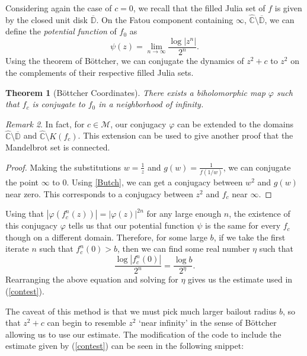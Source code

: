 \documentclass{amsart}
\newcommand{\bbC}{\mathbb{C}}
\newcommand{\cal}[1]{ \mathcal{#1}}
\newcommand{\bbCS}{\hat{\bbC}}
\newcommand{\Mand}{\cal{M}}
\newcommand{\abs}[1]{ \left| #1 \right| }
\renewcommand{\phi}{\varphi}
\newtheorem{thm}{Theorem}[section]
\theoremstyle{definition}
\theoremstyle{remark}
\newtheorem{rem}[thm]{Remark}
\numberwithin{equation}{section}
\begin{document}
Considering again the case of $c=0$, we recall that the filled Julia set of $f$ is given by the closed unit disk $\overline{\mathbb{D}}$. On the Fatou component containing $\infty$, $\bbCS\setminus \overline{\mathbb{D}}$, we can define the \emph{potential function} of $f_0$ as
\begin{equation}
  \psi(z)=\lim\limits_{n\to\infty}\frac{\log \abs{z^n}}{2^n}.
\end{equation}
Using the theorem of B\"ottcher, we can conjugate the dynamics of $z^2+c$ to $z^2$ on the complements of their respective filled Julia sets.
\begin{thm}[B\"ottcher Coordinates]
  There exists a biholomorphic map $\phi$ such that $f_c$ is conjugate to $f_0$ in a neighborhood of infinity.
\end{thm}
\begin{rem}
  In fact, for $c\in \Mand$, our conjugacy $\phi$ can be extended to the domains $\bbCS\setminus \overline{\mathbb{D}}$ and $\bbCS\setminus K(f_c)$. This extension can be used to give another proof that the Mandelbrot set is connected.
\end{rem}
\begin{proof}
Making the substitutions $w=\frac{1}{z}$ and $g(w)=\frac{1}{f(1/w)}$, we can conjugate the point $\infty$ to 0. Using \cref{Butch}, we can get a conjugacy between $w^2$ and $g(w)$ near zero. This corresponds to a conjugacy between $z^2$ and $f_c$ near $\infty$.
\end{proof}

Using that $\abs{\phi (f_c^n (z))}=\abs{\phi(z)}^{2n}$ for any large enough $n$, the existence of this conjugacy $\phi$ tells us that our potential function $\psi$ is the same for every $f_c$ though on a different domain. Therefore, for some large $b$, if we take the first iterate $n$ such that $f_c^n(0)>b$, then we can find some real number $\eta$ such that
\begin{equation}
  \frac{\log \abs{f_c^n(0)}}{2^n}=\frac{\log b}{2^{\eta}}.
\end{equation}
Rearranging the above equation and solving for $\eta$ gives us the estimate used in (\ref{contest}).

The caveat of this method is that we must pick much larger bailout radius $b$, so that $z^2+c$ can begin to resemble $z^2$ `near infinity' in the sense of B\"ottcher allowing us to use our estimate.
The modification of the code to include the estimate given by (\ref{contest}) can be seen in the following snippet:
\end{document}

